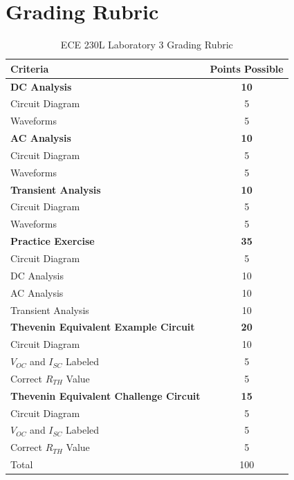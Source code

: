 \documentclass[12pt]{../manual}
\begin{document}
\section*{Grading Rubric}
\vfill %
\begin{table}[ht!]
\caption{ECE 230L Laboratory 3 Grading Rubric}
\centering
\begin{tabular}{l|c} \hline
Criteria & Points Possible \\ \hline \hline
\textbf{DC Analysis}			& \textbf{10} \\
Circuit Diagram 				& 5 \\
Waveforms 						& 5 \\ \hline
\textbf{AC Analysis}			& \textbf{10} \\
Circuit Diagram 				& 5 \\
Waveforms 						& 5 \\ \hline
\textbf{Transient Analysis}		& \textbf{10} \\
Circuit Diagram 				& 5 \\ 
Waveforms 						& 5 \\ \hline
\textbf{Practice Exercise}		& \textbf{35} \\
Circuit Diagram 				& 5 \\
DC Analysis						& 10 \\
AC Analysis						& 10 \\
Transient Analysis				& 10 \\ \hline
\textbf{Thevenin Equivalent Example Circuit} & \textbf{20} \\
Circuit Diagram					& 10 \\
$V_{OC}$ and $I_{SC}$ Labeled	& 5 \\
Correct $R_{TH}$ Value			& 5 \\ \hline
\textbf{Thevenin Equivalent Challenge Circuit} & \textbf{15} \\
Circuit Diagram					& 5 \\
$V_{OC}$ and $I_{SC}$ Labeled	& 5 \\
Correct $R_{TH}$ Value			& 5 \\ \hline \hline
Total							& 100 \\ \hline
\end{tabular}
\end{table}
\vfill %
\end{document}
